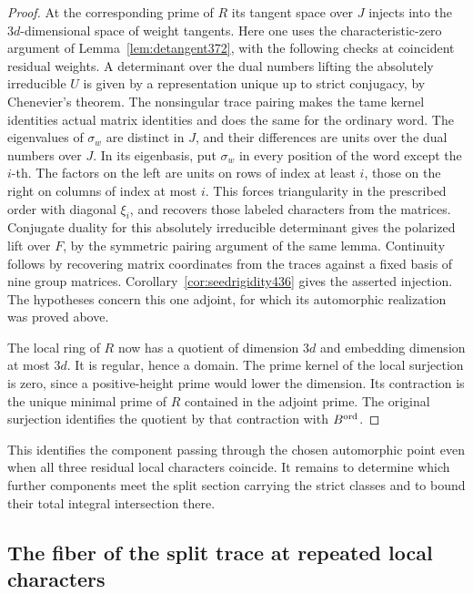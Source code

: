 \documentclass[a4paper,11pt]{article}
\theoremstyle{definition}
\theoremstyle{remark}
\numberwithin{equation}{section}
\begin{document}
\begin{proof}
At the corresponding prime of \(R\) its tangent space over
\(J\) injects into the \(3d\)-dimensional space of weight
tangents. Here one uses the characteristic-zero argument of
Lemma~\ref{lem:detangent372}, with the following checks at
coincident residual weights. A determinant over the dual
numbers lifting the absolutely irreducible \(U\) is given
by a representation unique up to strict conjugacy, by
Chenevier's theorem. The nonsingular trace pairing makes
the tame kernel identities actual matrix identities and
does the same for the ordinary word. The eigenvalues of
\(\sigma_w\) are distinct in \(J\), and their differences
are units over the dual numbers over \(J\). In its eigenbasis,
put \(\sigma_w\) in every position of the word except the
\(i\)-th. The factors on the left are units on rows of
index at least \(i\), those on the right on columns of index
at most \(i\). This forces triangularity in the prescribed
order with diagonal \(\xi_i\), and recovers those labeled
characters from the matrices. Conjugate duality for this
absolutely irreducible determinant gives the polarized lift
over \(F\), by the symmetric pairing argument of the same
lemma. Continuity follows by recovering matrix coordinates
from the traces against a fixed basis of nine group matrices.
Corollary~\ref{cor:seedrigidity436} gives the asserted
injection. The hypotheses concern this one adjoint, for
which its automorphic realization was proved above.

The local ring of \(R\) now has a quotient of dimension
\(3d\) and embedding dimension at most \(3d\). It is regular,
hence a domain. The prime kernel of the local surjection is
zero, since a positive-height prime would lower the dimension.
Its contraction is the unique minimal prime of \(R\) contained
in the adjoint prime. The original surjection identifies
the quotient by that contraction with \(B^{\rm ord}\).
\end{proof}

This identifies the component passing through the chosen
automorphic point even when all three residual local characters
coincide. It remains to determine which further components
meet the split section carrying the strict classes and to
bound their total integral intersection there.


\subsection{The fiber of the split trace at repeated local characters}
\label{sec:splitwordfiber438}
\end{document}

